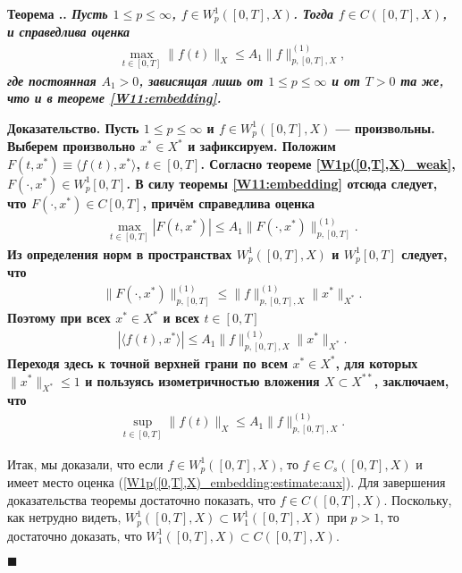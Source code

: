 \documentclass{report}
\newcounter{rem}[section]
\newcounter{theor}[section]
\renewcommand{\thetheor}{\thesection.\arabic{theor}}
\newenvironment{Theorem}{\par\refstepcounter{theor}\bf Теорема \thetheor. \it}{\rm\par}
\newenvironment{Proof}{\par\noindent\bf Доказательство.\rm}{ $\blacksquare$\par}
\begin{document}
\begin{Theorem}\label{W1p([0,T],X)_embedding}
Пусть $1\leqslant p\leqslant \infty$, $f\in W^1_p([0,T],X)$. Тогда $f\in C([0,T],X)$, и справедлива оценка
\begin{gather}\label{W1p([0,T],X)_embedding:estimate}
\max\limits_{t\in[0,T]}\|f(t)\|_X\leqslant A_1\|f\|_{p,[0,T],X}^{(1)},
\end{gather}
где постоянная $A_1>0$, зависящая лишь от $1\leqslant p\leqslant \infty$ и от $T>0$ та же, что и в теореме \ref{W11:embedding}.
\end{Theorem}
\begin{Proof}
Пусть $1\leqslant p\leqslant \infty$ и $f\in W^1_p([0,T],X)$ --- произвольны. Выберем произвольно $x^*\in X^*$ и зафиксируем. Положим $F(t,x^*)\equiv\langle f(t),x^*\rangle$, $t\in[0,T]$.
Согласно теореме \ref{W1p([0,T],X)_weak}, $F(\cdot,x^*)\in W^1_p[0,T]$. В силу теоремы \ref{W11:embedding} отсюда следует, что $F(\cdot,x^*)\in C[0,T]$, причём справедлива оценка
\begin{gather*}
\max\limits_{t\in[0,T]}|F(t,x^*)|\leqslant A_1\|F(\cdot,x^*)\|^{(1)}_{p,[0,T]}.
\end{gather*}
Из определения норм в пространствах $W^1_p([0,T],X)$ и $W^1_p[0,T]$ следует, что
\begin{gather*}
\|F(\cdot,x^*)\|^{(1)}_{p,[0,T]}\leqslant\|f\|_{p,[0,T],X}^{(1)}\|x^*\|_{X^*}.
\end{gather*}
Поэтому при всех $x^*\in X^*$ и всех $t\in[0,T]$
\begin{gather*}
|\langle f(t),x^*\rangle|\leqslant A_1\|f\|_{p,[0,T],X}^{(1)}\|x^*\|_{X^*}.
\end{gather*}
Переходя здесь к точной верхней грани по всем $x^*\in X^*$, для которых $\|x^*\|_{X^*}\leqslant 1$ и пользуясь изометричностью вложения $X\subset X^{**}$, заключаем, что
\begin{gather}\label{W1p([0,T],X)_embedding:estimate:aux}
\sup\limits_{t\in[0,T]}\|f(t)\|_X\leqslant A_1\|f\|_{p,[0,T],X}^{(1)}.
\end{gather}

Итак, мы доказали, что если $f\in W^1_p([0,T],X)$, то $f\in C_s([0,T],X)$ и имеет место оценка (\ref{W1p([0,T],X)_embedding:estimate:aux}). Для завершения доказательства теоремы достаточно
показать, что $f\in C([0,T],X)$. Поскольку, как нетрудно видеть, $W^1_p([0,T],X)\subset W^1_1([0,T],X)$ при $p>1$, то достаточно доказать, что $W^1_1([0,T],X)\subset C([0,T],X)$.


\end{Proof}
\end{document}
